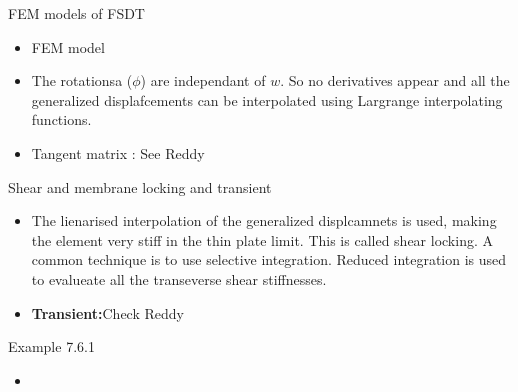 	\begin{frame}{FEM models of FSDT}
		\begin{itemize}
			\item FEM model
			\item  The rotationsa ($\phi$) are independant of $w$. So no derivatives appear and all the  generalized displafcements can be interpolated using Largrange interpolating functions.
			\item Tangent matrix : See Reddy
			
		\end{itemize}
	\end{frame}


	\begin{frame}{Shear and membrane locking and transient}
		\begin{itemize}
			\item The lienarised interpolation of the generalized displcamnets is used, making the element very stiff in the thin plate limit. This is called shear locking. A common technique is to use selective integration. Reduced integration is used to evalueate all the transeverse shear stiffnesses.			
			\item \textbf{Transient:}Check Reddy
	\end{itemize}
	\end{frame}

	\begin{frame}{Example 7.6.1}
		\begin{itemize}
			\item 
			
		\end{itemize}
	\end{frame}



